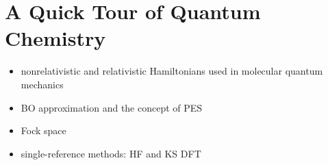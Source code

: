
\renewcommand{\thefigure}{\arabic{chapter}.\arabic{figure}}

\chapter{A Quick Tour of Quantum Chemistry}\label{ch:QM}

\begin{itemize}
  \item nonrelativistic and relativistic Hamiltonians used in molecular
    quantum mechanics
  \item \ac{BO} approximation and the concept of \ac{PES}
  \item Fock space
  \item single-reference methods: \ac{HF} and \ac{KS} \ac{DFT}
\end{itemize}

